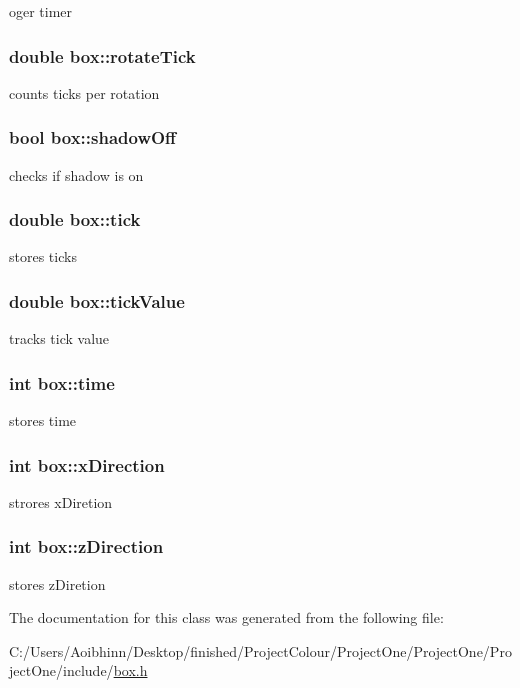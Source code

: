 oger timer \hypertarget{classbox_a46d6bfaa2beca404b86a12ac33e849a3}{
\subsubsection[{rotate\-Tick}]{\setlength{\rightskip}{0pt plus 5cm}double box\-::rotate\-Tick}}\label{classbox_a46d6bfaa2beca404b86a12ac33e849a3}
counts ticks per rotation \hypertarget{classbox_aede30efa073f3c74b5c625742ab99deb}{
\subsubsection[{shadow\-Off}]{\setlength{\rightskip}{0pt plus 5cm}bool box\-::shadow\-Off}}\label{classbox_aede30efa073f3c74b5c625742ab99deb}
checks if shadow is on \hypertarget{classbox_ad2e3d5ed2adf37059cca8c814a45d892}{
\subsubsection[{tick}]{\setlength{\rightskip}{0pt plus 5cm}double box\-::tick}}\label{classbox_ad2e3d5ed2adf37059cca8c814a45d892}
stores ticks \hypertarget{classbox_a3259d49a7e78981c7bbe64fe0d5e3e3d}{
\subsubsection[{tick\-Value}]{\setlength{\rightskip}{0pt plus 5cm}double box\-::tick\-Value}}\label{classbox_a3259d49a7e78981c7bbe64fe0d5e3e3d}
tracks tick value \hypertarget{classbox_a68fbb1af7f202fb26fce4dcfe9b62293}{
\subsubsection[{time}]{\setlength{\rightskip}{0pt plus 5cm}int box\-::time}}\label{classbox_a68fbb1af7f202fb26fce4dcfe9b62293}
stores time \hypertarget{classbox_a415ffc44d6f1b1ea7c50b0d07971f017}{
\subsubsection[{x\-Direction}]{\setlength{\rightskip}{0pt plus 5cm}int box\-::x\-Direction}}\label{classbox_a415ffc44d6f1b1ea7c50b0d07971f017}
strores x\-Diretion \hypertarget{classbox_a4c72d37c31f8bca128ce436b5c5e7f04}{
\subsubsection[{z\-Direction}]{\setlength{\rightskip}{0pt plus 5cm}int box\-::z\-Direction}}\label{classbox_a4c72d37c31f8bca128ce436b5c5e7f04}
stores z\-Diretion 

The documentation for this class was generated from the following file\-:\begin{DoxyCompactItemize}
\item 
C\-:/\-Users/\-Aoibhinn/\-Desktop/finished/\-Project\-Colour/\-Project\-One/\-Project\-One/\-Project\-One/include/\hyperlink{box_8h}{box.\-h}\end{DoxyCompactItemize}
